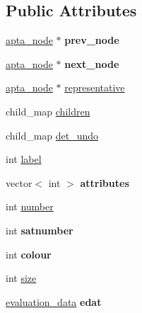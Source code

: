 \subsection*{Public Attributes}
\begin{DoxyCompactItemize}
\item 
\hyperlink{classapta__node}{apta\+\_\+node} $\ast$ {\bfseries prev\+\_\+node}\hypertarget{classapta__node_ac24a6098ad48833757b2e8efea99cbaf}{}\label{classapta__node_ac24a6098ad48833757b2e8efea99cbaf}

\item 
\hyperlink{classapta__node}{apta\+\_\+node} $\ast$ {\bfseries next\+\_\+node}\hypertarget{classapta__node_a260898870fa4025100f4176d81264a77}{}\label{classapta__node_a260898870fa4025100f4176d81264a77}

\item 
\hyperlink{classapta__node}{apta\+\_\+node} $\ast$ \hyperlink{classapta__node_aa2947d27209a9befd6458060419b2f43}{representative}
\item 
child\+\_\+map \hyperlink{classapta__node_a04c0ef7f20669b97f2c5c65edc4c044c}{children}
\item 
child\+\_\+map \hyperlink{classapta__node_a73996ef299e0ed3fdef53b68f6dc2204}{det\+\_\+undo}
\item 
int \hyperlink{classapta__node_aaba8e9487f1161584177a708aa700bea}{label}
\item 
vector$<$ int $>$ {\bfseries attributes}\hypertarget{classapta__node_a887f8daa1626cd4ffbc5effacf8395f3}{}\label{classapta__node_a887f8daa1626cd4ffbc5effacf8395f3}

\item 
int \hyperlink{classapta__node_aa4d8ad2056671f1e14ddb4123ac6f87e}{number}
\item 
int {\bfseries satnumber}\hypertarget{classapta__node_adb2ae7e0890e5421c29ab7f67628f699}{}\label{classapta__node_adb2ae7e0890e5421c29ab7f67628f699}

\item 
int {\bfseries colour}\hypertarget{classapta__node_a71d29ce9c86f145bd4854a5262d73829}{}\label{classapta__node_a71d29ce9c86f145bd4854a5262d73829}

\item 
int \hyperlink{classapta__node_a24c9dae152b759bb6a2ebcae6bbc36d5}{size}
\item 
\hyperlink{classevaluation__data}{evaluation\+\_\+data} {\bfseries edat}\hypertarget{classapta__node_a0104418ee2337dd0cbf6a5a50d486afe}{}\label{classapta__node_a0104418ee2337dd0cbf6a5a50d486afe}


\end{DoxyCompactItemize}
